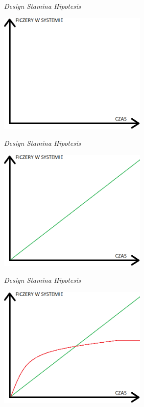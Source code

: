 \documentclass{beamer}
\begin{document}
\begin{frame}{\textit{Design Stamina Hipotesis}}
\begin{center}
  	\includegraphics[height=6cm]{design_stability_hipotesis1.png}
\end{center}
\end{frame}

\begin{frame}{\textit{Design Stamina Hipotesis}}
\begin{center}
  	\includegraphics[height=6cm]{design_stability_hipotesis2.png}
\end{center}
\end{frame}

\begin{frame}{\textit{Design Stamina Hipotesis}}
\begin{center}
  	\includegraphics[height=6cm]{design_stability_hipotesis3.png}
\end{center}
\end{frame}
\end{document}
